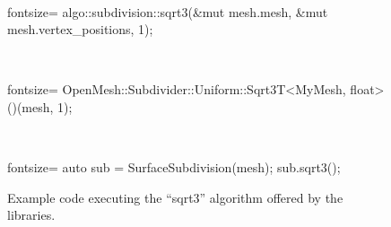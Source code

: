 \begin{figure}[p]
  \vspace{2mm}
  \\[-3mm]

  \hspace{.04\textwidth}
  \begin{minipage}{.9\textwidth}
    \begin{rustcode*}{fontsize=\footnotesize}
      algo::subdivision::sqrt3(&mut mesh.mesh, &mut mesh.vertex_positions, 1);
    \end{rustcode*}
  \end{minipage}\vspace{2mm}

  \vspace{2mm}
  \\[-3mm]

  \hspace{.04\textwidth}
  \begin{minipage}{.9\textwidth}
    \begin{cppcode*}{fontsize=\footnotesize}
      OpenMesh::Subdivider::Uniform::Sqrt3T<MyMesh, float>()(mesh, 1);
    \end{cppcode*}
  \end{minipage}\vspace{2mm}

  \vspace{2mm}
  \\[-3mm]

  \hspace{.04\textwidth}
  \begin{minipage}{.9\textwidth}
    \begin{cppcode*}{fontsize=\footnotesize}
      auto sub = SurfaceSubdivision(mesh);
      sub.sqrt3();
    \end{cppcode*}
  \end{minipage}

  \caption{
    Example code executing the \enquote{sqrt3} algorithm offered by the libraries.
  }
  \label{fig:example-sqrt3}
\end{figure}

